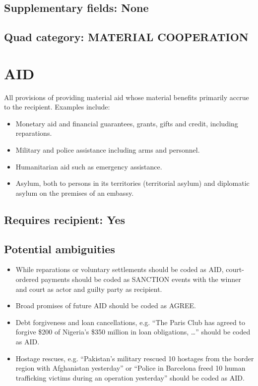 \documentclass[11pt]{report}
\newcommand{\plcat}[1]{\textsf{#1}}
\begin{document}
\subsection{Supplementary fields: None}

\subsection{Quad category: MATERIAL COOPERATION}


\newpage

\section{AID}

All provisions of providing material aid whose material benefits primarily accrue to the recipient. Examples include:

\begin{itemize}

\item Monetary aid and financial guarantees, grants, gifts and credit, including reparations.

\item Military and police assistance including arms and personnel.

\item Humanitarian aid such as emergency assistance.

\item Asylum, both to persons in its territories (territorial asylum) and diplomatic asylum on the premises of an embassy.

\end{itemize}

\subsection{Requires recipient: Yes}

\subsection{Potential ambiguities}

\begin{itemize}
\item While reparations or voluntary settlements should be coded as \plcat{AID}, court-ordered payments should be coded as \plcat{SANCTION} events with the winner and court as actor and guilty party as recipient.
\item Broad promises of future \plcat{AID} should be coded as \plcat{AGREE}.
\item Debt forgiveness and loan cancellations, e.g. ``The Paris Club has agreed to forgive \$200 of Nigeria’s \$350 million in loan obligations, \dots'' should be coded as \plcat{AID}.
\item Hostage rescues, e.g. ``Pakistan’s military rescued 10 hostages from the border region with Afghanistan yesterday'' or ``Police in Barcelona freed 10 human trafficking victims during an operation yesterday'' should be coded as \plcat{AID}.
\end{itemize}
\end{document}

